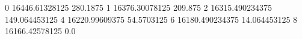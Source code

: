 0 16446.61328125 280.1875
1 16376.30078125 209.875
2 16315.490234375 149.064453125
4 16220.99609375 54.5703125
6 16180.490234375 14.064453125
8 16166.42578125 0.0
